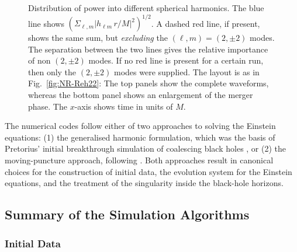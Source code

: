 \begin{figure}
\caption[Distribution of power into different spherical harmonics]{
\label{fig:NR-SumAllModes}
Distribution of power into different spherical harmonics.  The blue line shows
  $\left(\Sigma_{\ell,m}|h_{\ell m}\,r/M|^2\right)^{1/2}$.  A dashed red line, if
  present, shows the same sum, but {\em excluding} the $(\ell,m)=(2,\pm
  2)$ modes. 
  The separation between the two lines gives the relative importance
  of non $(2,\pm 2)$ modes.  If no red line is present for a certain
  run, then only the $(2,\pm 2)$ modes were supplied.  The layout is
  as in Fig.~\ref{fig:NR-Reh22}: The top panels show the complete
  waveforms, whereas the bottom panel shows an enlargement of the
  merger phase. The $x$-axis shows time in units of $M$.
}
\end{figure}

\iffalse
The numerical codes follow either of two approaches to solving the
Einstein equations: (1) the generalised harmonic formulation, which
was the basis of Pretorius' initial breakthrough simulation of
coalescing black holes \cite{Pretorius:2005gq}, or (2) the
moving-puncture approach, following
\cite{Campanelli:2005dd,Baker:2005vv}.  Both approaches result in
canonical choices for the construction of initial data, the evolution
system for the Einstein equations, and the treatment of the
singularity inside the black-hole horizons.


\subsection{Summary of the Simulation Algorithms}
\label{ssec:sumalg}

\subsubsection{Initial Data}
\label{ssec:id}

